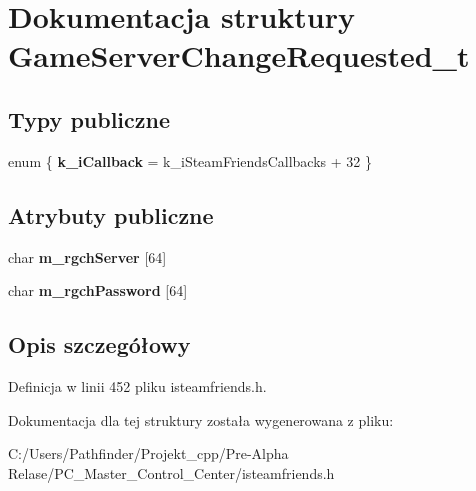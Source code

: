 \hypertarget{struct_game_server_change_requested__t}{}\section{Dokumentacja struktury Game\+Server\+Change\+Requested\+\_\+t}
\label{struct_game_server_change_requested__t}
\subsection*{Typy publiczne}
\begin{DoxyCompactItemize}
\item 
\mbox{\label{struct_game_server_change_requested__t_a2fc7a400bd923274e1154311b3b9a7eb}} 
enum \{ {\bfseries k\+\_\+i\+Callback} = k\+\_\+i\+Steam\+Friends\+Callbacks + 32
 \}
\end{DoxyCompactItemize}
\subsection*{Atrybuty publiczne}
\begin{DoxyCompactItemize}
\item 
\mbox{\label{struct_game_server_change_requested__t_a665efa8b7a8b7d836540d05e605032e7}} 
char {\bfseries m\+\_\+rgch\+Server} \mbox{[}64\mbox{]}
\item 
\mbox{\label{struct_game_server_change_requested__t_a1c9c2d3516c2e9d637883a4de55e800c}} 
char {\bfseries m\+\_\+rgch\+Password} \mbox{[}64\mbox{]}
\end{DoxyCompactItemize}


\subsection{Opis szczegółowy}


Definicja w linii 452 pliku isteamfriends.\+h.



Dokumentacja dla tej struktury została wygenerowana z pliku\+:\begin{DoxyCompactItemize}
\item 
C\+:/\+Users/\+Pathfinder/\+Projekt\+\_\+cpp/\+Pre-\/\+Alpha Relase/\+P\+C\+\_\+\+Master\+\_\+\+Control\+\_\+\+Center/isteamfriends.\+h\end{DoxyCompactItemize}
